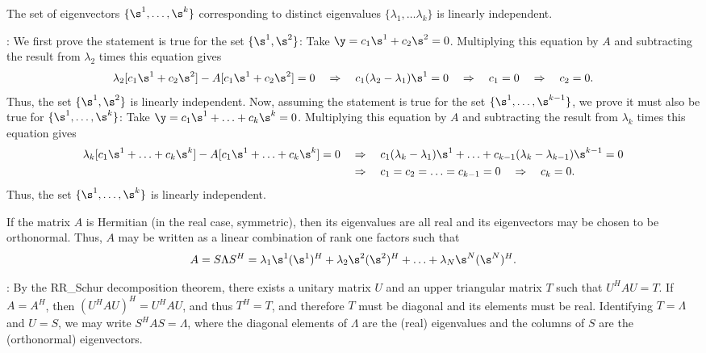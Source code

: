 \begin{fact} \label{fact.A.D.D.A}
The set of eigenvectors $\{\s^{1},\ldots,\s^{k}\}$ corresponding to
distinct eigenvalues $\{\lambda_{1},\ldots\lambda_{k}\}$ is linearly
independent.
\end{fact}

\/: We first prove the statement
is true for the set $\{\s^{1},\s^{2}\}$: Take
$\y=c_{1}\s^{1}+c_{2}\s^{2}=0$.  Multiplying this equation by $A$ and
subtracting the result from $\lambda_{2}$ times this equation gives
\begin{equation*}
    \lambda_{2}[c_{1}\s^{1}+c_{2}\s^{2}] - A[c_{1}\s^{1}+c_{2}\s^{2}] =0 \quad \Rightarrow \quad
    c_{1} (\lambda_{2}-\lambda_{1}) \s^{1} = 0 \quad \Rightarrow \quad c_{1}=0 \quad \Rightarrow \quad c_{2}=0.
\end{equation*}
Thus, the set $\{\s^{1},\s^{2}\}$ is linearly independent.  Now,
assuming the statement is true for the set
$\{\s^{1},\ldots,\s^{k-1}\}$, we prove it must also be true for
$\{\s^{1},\ldots,\s^{k}\}$: Take
$\y=c_{1}\s^{1}+\ldots+c_{k}\s^{k}=0$.  Multiplying this equation by
$A$ and subtracting the result from $\lambda_{k}$ times this equation
gives
\begin{align*}
    \lambda_{k}[c_{1}\s^{1}+\ldots+c_{k}\s^{k}] -
    A[c_{1}\s^{1}+\ldots+c_{k}\s^{k}] =0 \quad &\Rightarrow \quad c_{1}
    (\lambda_{k}-\lambda_{1}) \s^{1} + \ldots + c_{k-1}
    (\lambda_{k}-\lambda_{k-1}) \s^{k-1} = 0 \\ &\Rightarrow \quad
    c_{1}=c_{2}=\ldots=c_{k-1}=0 \quad \Rightarrow \quad c_{k}=0.
\end{align*}
Thus, the set $\{\s^{1},\ldots,\s^{k}\}$ is linearly independent. \endproof

\begin{fact} \label{fact.A.D.D.B}
If the matrix $A$ is Hermitian (in the real case,
symmetric), then its eigenvalues are all real and its eigenvectors may be
chosen to be orthonormal.  Thus, $A$ may be written as a linear combination of rank one
factors such that
\begin{equation*}
A=S\Lambda S^H = \lambda_1 \s^1 (\s^1)^H + \lambda_2 \s^2 (\s^2)^H + \ldots + \lambda_N \s^N (\s^N)^H.
\end{equation*}
\end{fact}

\/: By the RR_Schur decomposition theorem, there
exists a unitary matrix $U$ and an upper triangular matrix $T$ such
that $U^{H}AU=T$.  If $A=A^{H}$, then $(U^{H}AU)^{H}=U^{H}AU$, and
thus $T^{H}=T$, and therefore $T$ must be diagonal and its elements
must be real.  Identifying $T=\Lambda$ and $U=S$, we may write
$S^{H}A S=\Lambda$, where the diagonal elements of $\Lambda$ are the
(real) eigenvalues and the columns of $S$ are the (orthonormal)
eigenvectors.   \endproof

